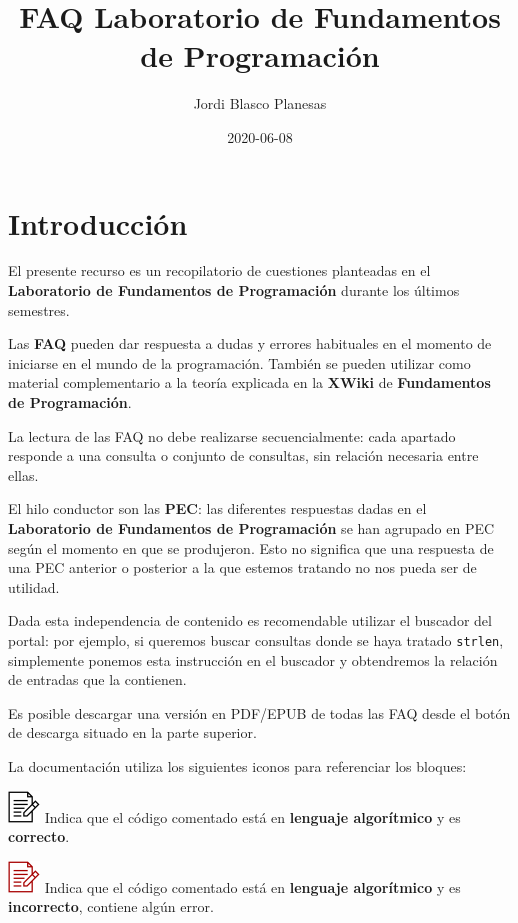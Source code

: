 \documentclass[
]{book}
\title{FAQ Laboratorio de Fundamentos de Programación}
\author{Jordi Blasco Planesas}
\date{2020-06-08}
\begin{document}
\frontmatter
\maketitle

{
\setcounter{tocdepth}{1}
\tableofcontents
}
\mainmatter
\hypertarget{introducciuxf3n}{%
\chapter*{Introducción}\label{introducciuxf3n}}

El presente recurso es un recopilatorio de cuestiones planteadas en el \textbf{Laboratorio de Fundamentos de Programación} durante los últimos semestres.

Las \textbf{FAQ} pueden dar respuesta a dudas y errores habituales en el momento de iniciarse en el mundo de la programación. También se pueden utilizar como material complementario a la teoría explicada en la \textbf{XWiki} de \textbf{Fundamentos de Programación}.

La lectura de las FAQ no debe realizarse secuencialmente: cada apartado responde a una consulta o conjunto de consultas, sin relación necesaria entre ellas.

El hilo conductor son las \textbf{PEC}: las diferentes respuestas dadas en el \textbf{Laboratorio de Fundamentos de Programación} se han agrupado en PEC según el momento en que se produjeron. Esto no significa que una respuesta de una PEC anterior o posterior a la que estemos tratando no nos pueda ser de utilidad.

Dada esta independencia de contenido es recomendable utilizar el buscador del portal: por ejemplo, si queremos buscar consultas donde se haya tratado \texttt{strlen}, simplemente ponemos esta instrucción en el buscador y obtendremos la relación de entradas que la contienen.

Es posible descargar una versión en PDF/EPUB de todas las FAQ desde el botón de descarga situado en la parte superior.

La documentación utiliza los siguientes iconos para referenciar los bloques:

\includegraphics{./img/alg.png} Indica que el código comentado está en \textbf{lenguaje algorítmico} y es \textbf{correcto}.

\includegraphics{./img/alg_err.png} Indica que el código comentado está en \textbf{lenguaje algorítmico} y es \textbf{incorrecto}, contiene algún error.
\end{document}
